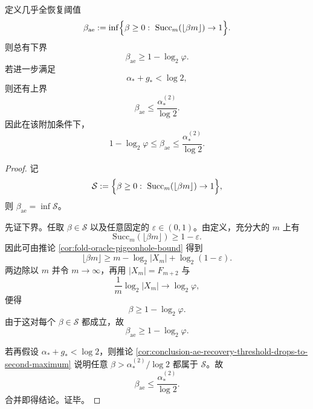 \begin{theorem}[几乎全恢复位阈值的双侧夹逼]\label{thm:conclusion-ae-recovery-threshold-sandwich}
定义几乎全恢复阈值
\[
\beta_{\mathrm{ae}}
:=
\inf\Bigl\{\beta\ge 0:\ \mathrm{Succ}_m(\lfloor \beta m\rfloor)\to 1\Bigr\}.
\]
则总有下界
\[
\beta_{\mathrm{ae}}\ge 1-\log_2\varphi.
\]
若进一步满足
\[
\alpha_\ast+g_\ast<\log 2,
\]
则还有上界
\[
\beta_{\mathrm{ae}}\le \frac{\alpha_\ast^{(2)}}{\log 2}.
\]
因此在该附加条件下，
\[
1-\log_2\varphi
\le
\beta_{\mathrm{ae}}
\le
\frac{\alpha_\ast^{(2)}}{\log 2}.
\]
\end{theorem}
\begin{proof}
记
\[
\mathcal S:=
\Bigl\{\beta\ge 0:\ \mathrm{Succ}_m(\lfloor \beta m\rfloor)\to 1\Bigr\},
\]
则 \(\beta_{\mathrm{ae}}=\inf \mathcal S\)。

先证下界。任取 \(\beta\in\mathcal S\) 以及任意固定的 \(\varepsilon\in(0,1)\)。由定义，充分大的 \(m\) 上有
\[
\mathrm{Succ}_m(\lfloor \beta m\rfloor)\ge 1-\varepsilon.
\]
因此可由推论 \ref{cor:fold-oracle-pigeonhole-bound} 得到
\[
\lfloor \beta m\rfloor
\ge
m-\log_2|X_m|+\log_2(1-\varepsilon).
\]
两边除以 \(m\) 并令 \(m\to\infty\)，再用 \(|X_m|=F_{m+2}\) 与
\[
\frac1m\log_2|X_m|\to \log_2\varphi,
\]
便得
\[
\beta\ge 1-\log_2\varphi.
\]
由于这对每个 \(\beta\in\mathcal S\) 都成立，故
\[
\beta_{\mathrm{ae}}\ge 1-\log_2\varphi.
\]

若再假设 \(\alpha_\ast+g_\ast<\log 2\)，则推论
\ref{cor:conclusion-ae-recovery-threshold-drops-to-second-maximum}
说明任意
\(
\beta>\alpha_\ast^{(2)}/\log 2
\)
都属于 \(\mathcal S\)。故
\[
\beta_{\mathrm{ae}}\le \frac{\alpha_\ast^{(2)}}{\log 2}.
\]
合并即得结论。证毕。
\end{proof}

